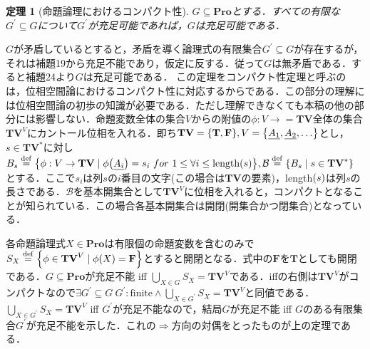 \documentclass{ltjsarticle}
\makeatletter
\theoremstyle{mystyle1}
\theoremstyle{mystyle3}
\newtheorem{thm}[cor]{定理}
\theoremstyle{mystyle2}
\renewenvironment{proof}[1][\proofname]{\par
  \pushQED{\qed}%
  \normalfont
  \topsep6\p@\@plus6\p@ \trivlist
  \item[\hskip\labelsep{\bfseries\sffamily #1}]\ignorespaces
}{%
  \popQED\endtrivlist\@endpefalse
}
\renewcommand\proofname{証明:}
\newcommand{\bT}{\ensuremath{\mathbf{T}}}
\newcommand{\bF}{\ensuremath{\mathbf{F}}}
\newcommand{\bPro}{\ensuremath{\mathbf{Pro}}}
\newcommand{\bTV}{\ensuremath{\mathbf{TV}}}
\newcommand{\dequal}{\ensuremath{\stackrel{\rm{def}}{=}}}
\makeatother
\begin{document}
\begin{thm}[命題論理におけるコンパクト性]
  $G\subseteq\bPro$とする．すべての有限な$G^\prime \subseteq G$について$G^\prime$が充足可能であれば，$G$は充足可能である．
\end{thm}
\begin{proof}
  $G$が矛盾しているとすると，矛盾を導く論理式の有限集合$G^\prime\subseteq G$が存在するが，それは補題19から充足不能であり，仮定に反する．従って$G$は無矛盾である．すると補題24より$G$は充足可能である．
\end{proof}
この定理をコンパクト性定理と呼ぶのは，位相空間論におけるコンパクト性に対応するからである．この部分の理解には位相空間論の初歩の知識が必要である．ただし理解できなくても本稿の他の部分には影響しない．命題変数全体の集合$V$からの附値の$\phi:V\to=\bTV$全体の集合$\bTV^V$にカントール位相を入れる．即ち$\bTV = \qty{\bT, \bF}, V = \qty{\underline{A_1}, \underline{A_2}, \ldots }$とし，$s\in\bTV^\ast$に対し$B_s\dequal\qty{\phi: V \to \bTV\mid\phi\qty(\underline{A_i}) = s_i\ for\ 1 \leq\forall i \leq \text{length}\qty(s)}, \mathcal{B}\dequal\qty{B_s\mid s\in \bTV^\ast}$とする．ここで$s_i$は列$s$の$i$番目の文字(この場合は$\bTV$の要素)，length$\qty(s)$は列$s$の長さである．$\mathcal{B}$を基本開集合として$\bTV^V$に位相を入れると，コンパクトとなることが知られている．この場合各基本開集合は開閉(開集合かつ閉集合)となっている．

各命題論理式$X\in\bPro$は有限個の命題変数を含むのみで$S_X\dequal\qty{\phi\in\bTV^V\mid\phi\qty(X)=\bF}$とすると開閉となる．式中の$\bF$を$\bT$としても開閉である．$G\subseteq\bPro$が充足不能 iff $\bigcup_{X\in G}S_X = \bTV^V$である．iffの右側は$\bTV^V$がコンパクトなので$\exists G^\prime\subseteq G\ G^\prime : \text{finite}\wedge\bigcup_{X\in G^\prime}S_X = \bTV^V$と同値である．$\bigcup_{X\in G^\prime}S_X = \bTV^V$ iff $G^\prime$が充足不能なので，結局$G$が充足不能 iff $G$のある有限集合$G^\prime$が充足不能を示した．これの$\Rightarrow$方向の対偶をとったものが上の定理である．
\end{document}
